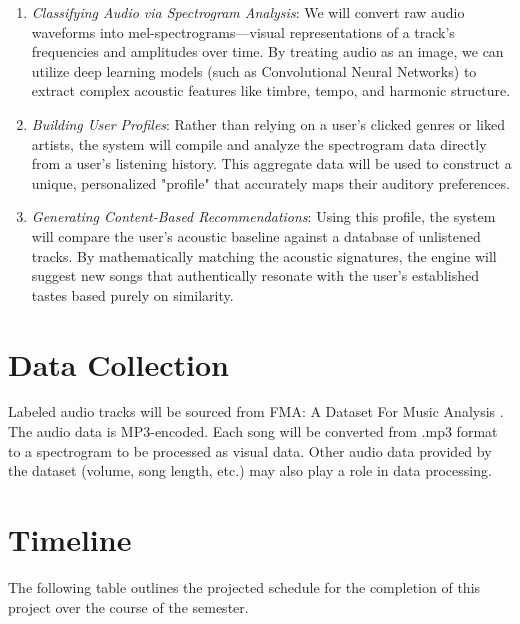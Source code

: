 \documentclass[10pt, twocolumn]{article}
\begin{document}
\begin{enumerate}
	\item \textit{Classifying Audio via Spectrogram Analysis}: We will convert raw audio waveforms into mel-spectrograms—visual representations of a track's frequencies and amplitudes over time. By treating audio as an image, we can utilize deep learning models (such as Convolutional Neural Networks) to extract complex acoustic features like timbre, tempo, and harmonic structure.

	\item \textit{Building User Profiles}: Rather than relying on a user's clicked genres or liked artists, the system will compile and analyze the spectrogram data directly from a user’s listening history. This aggregate data will be used to construct a unique, personalized "profile" that accurately maps their auditory preferences.

	\item \textit{Generating Content-Based Recommendations}: Using this profile, the system will compare the user's acoustic baseline against a database of unlistened tracks. By mathematically matching the acoustic signatures, the engine will suggest new songs that authentically resonate with the user's established tastes based purely on similarity.
\end{enumerate}

\section{Data Collection}
Labeled audio tracks will be sourced from FMA: A Dataset For Music Analysis \cite{defferrard2017}. The audio data is MP3-encoded. Each song will be converted from .mp3 format to a spectrogram to be processed as visual data. Other audio data provided by the dataset (volume, song length, etc.) may also play a role in data processing.

\section{Timeline}
The following table outlines the projected schedule for the completion of this project over the course of the semester.
\end{document}
